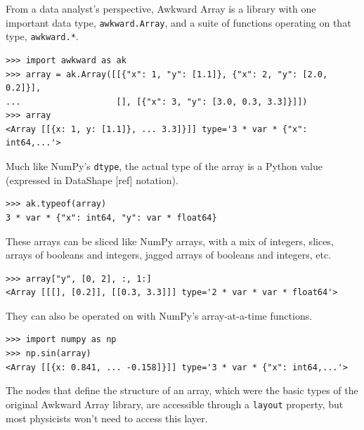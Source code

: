 \documentclass{webofc}
\begin{document}
From a data analyst's perspective, Awkward Array is a library with one important data type, \texttt{awkward.Array}, and a suite of functions operating on that type, \texttt{awkward.*}.

\begin{verbatim}
>>> import awkward as ak
>>> array = ak.Array([[{"x": 1, "y": [1.1]}, {"x": 2, "y": [2.0, 0.2]}],
...                   [], [{"x": 3, "y": [3.0, 0.3, 3.3]}]])
>>> array
<Array [[{x: 1, y: [1.1]}, ... 3.3]}]] type='3 * var * {"x": int64,...'>
\end{verbatim}

\noindent Much like NumPy's \texttt{dtype}, the actual type of the array is a Python value (expressed in DataShape [ref] notation).

\begin{verbatim}
>>> ak.typeof(array)
3 * var * {"x": int64, "y": var * float64}
\end{verbatim}

\noindent These arrays can be sliced like NumPy arrays, with a mix of integers, slices, arrays of booleans and integers, jagged arrays of booleans and integers, etc.

\begin{verbatim}
>>> array["y", [0, 2], :, 1:]
<Array [[[], [0.2]], [[0.3, 3.3]]] type='2 * var * var * float64'>
\end{verbatim}

\noindent They can also be operated on with NumPy's array-at-a-time functions.

\begin{verbatim}
>>> import numpy as np
>>> np.sin(array)
<Array [[{x: 0.841, ... -0.158]}]] type='3 * var * {"x": int64,...'>
\end{verbatim}

The nodes that define the structure of an array, which were the basic types of the original Awkward Array library, are accessible through a \texttt{layout} property, but most physicists won't need to access this layer.

\end{document}
